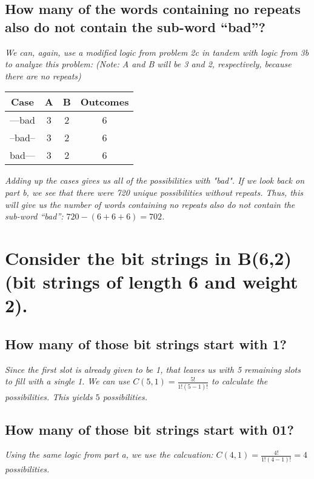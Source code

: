 \documentclass{article}
\begin{document}
\subsection{How many of the words containing no repeats also do not contain the sub-word “bad”?}
\hspace{1cm}\textit{We can, again, use a modified logic from problem 2c in tandem with logic from
    3b to analyze this problem: (Note: A and B will be 3 and 2, respectively, because there are no
    repeats)}
\begin{center}
     \begin{tabular}{c|c|c|c}
         Case & A & B & Outcomes \\
         \hline
         ---bad & 3 & 2 & 6 \\
         \hline
         --bad-- & 3 & 2 & 6 \\
         \hline
         bad--- & 3 & 2 & 6 \\
         \hline
     \end{tabular}
 \end{center}
 \hspace{1cm}\textit{Adding up the cases gives us all of the possibilities with "bad". If we look back
    on part b, we see that there were 720 unique possibilities without repeats. Thus, this will give us
    the number of words containing no repeats also do not contain the sub-word “bad”:
    $720-(6+6+6) = 702$.}

\section{Consider the bit strings in B(6,2) (bit strings of length 6 and weight 2).}
\subsection{How many of those bit strings start with 1?}
\hspace{1cm}\textit{Since the first slot is already given to be 1, that leaves us with 5 remaining slots to 
    fill with a single 1. We can use $C(5,1) = \frac{5!}{1!(5-1)!}$ to calculate the possibilities.
    This yields $5$ possibilities.}
\subsection{How many of those bit strings start with 01?}
\hspace{1cm}\textit{Using the same logic from part a, we use the calcuation:
    $C(4,1) = \frac{4!}{1!(4-1)!} = 4$ possibilities.}
    \clearpage
\end{document}
